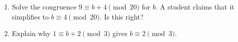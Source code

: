 \begin{enumerate}
\item[(a)] Solve the congruence $9\equiv b+4\pmod{20}$ for $b$. A student claims that it simplifies to $b\equiv4\pmod{20}$. Is this right?
\item[(b)] Explain why $1\equiv b+2\pmod3$ gives $b\equiv2\pmod3$.
\end{enumerate}
